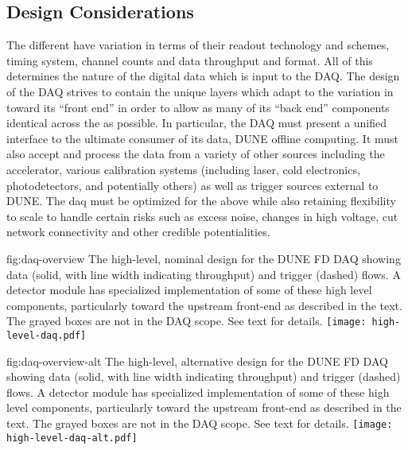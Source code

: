 \subsection{Design Considerations}
\label{sec:fd-daq-des-consid}

The different  have variation in terms of their
readout technology and schemes, timing system, channel counts and data
throughput and format.
All of this determines the nature of the digital data which is input
to the DAQ. 
The design of the DAQ strives to contain the unique layers which adapt
to the variation in  toward its ``front end'' in
order to allow as many of its ``back end'' components identical across
the  as possible. 
In particular, the DAQ must present a unified interface to the
ultimate consumer of its data, DUNE offline computing.
It must also accept and process the data from a variety of other
sources including the accelerator, various calibration systems
(including laser, cold electronics, photodetectors, and potentially
others) as well as trigger sources external to DUNE. 
The daq must be optimized for the above while also retaining
flexibility to scale to handle certain risks such as excess noise,
changes in high voltage, cut network connectivity and other credible
potentialities.

\begin{dunefigure}{fig:daq-overview}
  {The high-level, nominal design for the DUNE FD DAQ showing data (solid, with
    line width indicating throughput) and trigger (dashed) flows. 
    A detector module has specialized implementation of some of these
    high level components, particularly toward the upstream front-end
    as described in the text. 
    The grayed boxes are not in the DAQ scope.
    See text for details.
}
\texttt{[image: high-level-daq.pdf]}%
\end{dunefigure}

\begin{dunefigure}{fig:daq-overview-alt}
  {The high-level, alternative design for the DUNE FD DAQ showing data (solid, with
    line width indicating throughput) and trigger (dashed) flows. 
    A detector module has specialized implementation of some of these
    high level components, particularly toward the upstream front-end
    as described in the text. 
    The grayed boxes are not in the DAQ scope.
    See text for details.
}
\texttt{[image: high-level-daq-alt.pdf]}%
\end{dunefigure}

